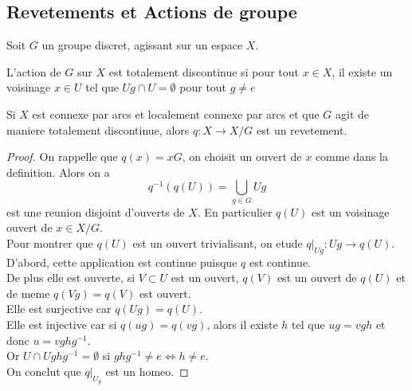 \documentclass[../main.tex]{subfiles}
\begin{document}
\subsection{Revetements et Actions de groupe}
Soit $G$ un groupe discret, agissant sur un espace $X$.\\
\begin{defn}
L'action de $G$ sur $X$ est totalement discontinue si pour tout $x\in X$, il existe un voisinage $x\in U$ tel que $Ug \cap U = \emptyset$ pour tout $g\neq e $ 	
\end{defn}
\begin{propo}
Si $X$ est connexe par arcs et localement connexe par arcs et que $G$ agit de maniere totalement discontinue, alors $q: X\to X /G$ est un revetement.
\end{propo}
\begin{proof}
On rappelle que $q( x) = xG$, on choisit un ouvert de $x$ comme dans la definition. Alors on a 
\[ 
q^{-1}( q( U) ) = \bigcup_{g\in G} Ug
\]
est une reunion disjoint d'ouverts de $X$. En particulier $q( U) $ est un voisinage ouvert de $x\in X/G$.\\
Pour montrer que $q( U) $ est un ouvert trivialisant, on etude $q|_{Ug} : Ug \to q( U) $.\\
D'abord, cette application est continue puisque $q$ est continue.\\
De plus elle est ouverte, si $V \subset U$ est un ouvert, $q( V) $ est un ouvert de $q( U) $ et de meme $q( Vg) = q( V) $ est ouvert.\\
Elle est surjective car $q( Ug) = q( U) $.\\
Elle est injective car si $q( ug) = q( vg) $, alors il existe $h$ tel que $ug = vgh $ et donc $u = vghg^{-1}$.\\
Or $U \cap U ghg^{-1}= \emptyset$ si $ghg^{-1}\neq e \iff h \neq e  $.\\
On conclut que $q|_{U_g} $ est un homeo.
\end{proof}
\end{document}
